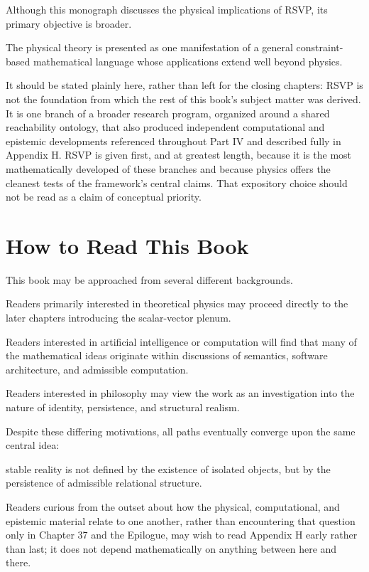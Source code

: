 \documentclass[11pt,oneside]{book}
\numberwithin{equation}{chapter}
\theoremstyle{definition}
\theoremstyle{plain}
\begin{document}
Although this monograph discusses the physical implications of RSVP, its
primary objective is broader.

The physical theory is presented as one manifestation of a general
constraint-based mathematical language whose applications extend well beyond
physics.

It should be stated plainly here, rather than left for the closing
chapters: RSVP is not the foundation from which the rest of this book's
subject matter was derived. It is one branch of a broader research
program, organized around a shared reachability ontology, that also
produced independent computational and epistemic developments referenced
throughout Part IV and described fully in Appendix H. RSVP is given
first, and at greatest length, because it is the most mathematically
developed of these branches and because physics offers the cleanest tests
of the framework's central claims. That expository choice should not be
read as a claim of conceptual priority.

\section{How to Read This Book}

This book may be approached from several different backgrounds.

Readers primarily interested in theoretical physics may proceed directly to
the later chapters introducing the scalar-vector plenum.

Readers interested in artificial intelligence or computation will find that
many of the mathematical ideas originate within discussions of semantics,
software architecture, and admissible computation.

Readers interested in philosophy may view the work as an investigation into
the nature of identity, persistence, and structural realism.

Despite these differing motivations, all paths eventually converge upon the
same central idea:

stable reality is not defined by the existence of isolated objects, but by
the persistence of admissible relational structure.

Readers curious from the outset about how the physical, computational, and
epistemic material relate to one another, rather than encountering that
question only in Chapter 37 and the Epilogue, may wish to read Appendix H
early rather than last; it does not depend mathematically on anything
between here and there.
\end{document}

